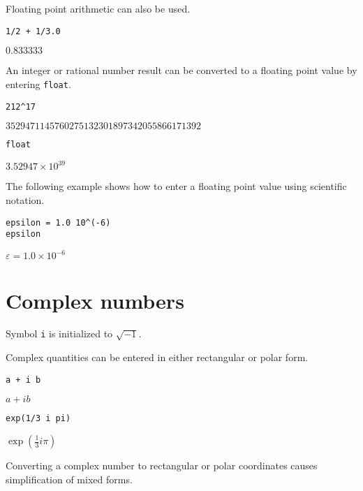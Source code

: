 \documentclass[12pt]{article}
\begin{document}
Floating point arithmetic can also be used.

{\color{blue}
\begin{verbatim}
1/2 + 1/3.0
\end{verbatim}
}

$\displaystyle 0.833333$

\bigskip

An integer or rational number result can be converted to a floating
point value by entering \verb$float$.

{\color{blue}
\begin{verbatim}
212^17
\end{verbatim}
}

$\displaystyle 3529471145760275132301897342055866171392$

{\color{blue}
\begin{verbatim}
float
\end{verbatim}
}

$\displaystyle 3.52947\times10^{39}$

\bigskip
The following example shows how to enter a floating point value
using scientific notation.

{\color{blue}
\begin{verbatim}
epsilon = 1.0 10^(-6)
epsilon
\end{verbatim}
}

$\displaystyle \varepsilon=1.0\times10^{-6}$

\newpage

\section{Complex numbers}

Symbol \verb$i$ is initialized to $\sqrt{-1}$.

\bigskip

Complex quantities can be entered in either rectangular or polar form.

{\color{blue}
\begin{verbatim}
a + i b
\end{verbatim}
}

$\displaystyle a+ib$

{\color{blue}
\begin{verbatim}
exp(1/3 i pi)
\end{verbatim}
}

$\displaystyle \exp\left(\tfrac{1}{3}i\pi\right)$

\bigskip

Converting a complex number to rectangular or polar coordinates causes
simplification of mixed forms.
\end{document}
